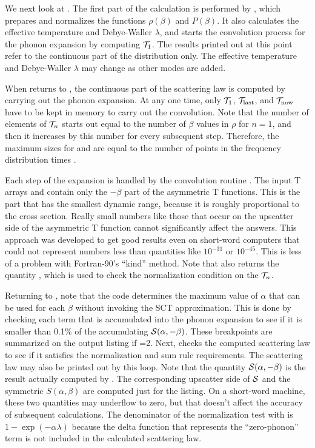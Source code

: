 We next look at . The
first part of the calculation is performed by
, which prepares and
normalizes the functions $\rho(\beta)$ and $P(\beta)$.  It also
calculates the effective temperature and Debye-Waller $\lambda$,
and starts the convolution process for the phonon expansion by
computing ${\cal T}_1$.  The results printed out at this point
refer to the continuous part of the distribution only.  The
effective temperature and Debye-Waller $\lambda$ may change
as other modes are added.

When  returns to , the continuous part of
the scattering law is computed by carrying out the phonon expansion.
At any one time, only ${\cal T}_1$, ${\cal T}_{\rm last}$, and
${\cal T}_{\rm now}$ have to be kept in memory to carry out the
convolution.  Note that the number of elements of ${\cal T}_n$ starts
out equal to the number of $\beta$ values in $\rho$ for $n{=}1$, and then
it increases by this number for every subsequent step. Therefore, the
maximum sizes for  and  are equal to the number
of points in the frequency distribution times .

Each step of the expansion is handled by the convolution routine
.  The input T arrays
 and  contain only the $-\beta$
part of the asymmetric T functions.  This is the part that
has the smallest dynamic range, because it is roughly proportional to
the cross section.  Really small numbers like those that occur on the
upscatter side of the asymmetric T function cannot significantly affect
the answers.  This approach was developed to get good results even on
short-word computers that could not represent numbers less than
quantities like $10^{-31}$ or $10^{-45}$.  This is less of a problem
with Fortran-90's ``kind'' method.  Note that 
also returns the quantity , which is used to check the
normalization condition on the ${\cal T}_n$.

Returning to , note that the code determines the maximum
value of $\alpha$ that can be used for each $\beta$ without invoking
the SCT approximation.  This is done by checking each term that is
accumulated into the phonon expansion to see if it is smaller than 0.1\%
of the accumulating ${\cal S}(\alpha,-\beta)$.  These breakpoints are
summarized on the output listing if =2.  Next,
 checks the computed scattering law to see if it satisfies
the normalization and sum rule requirements.  The scattering law may
also be printed out by this loop.  Note that the quantity
${\cal S}(\alpha,-\beta)$ is the result actually computed by
.  The corresponding upscatter side of ${\cal S}$ and
the symmetric $S(\alpha,\beta)$ are computed just for the listing.
On a short-word machine, these two quantities may underflow to zero,
but that doesn't affect the accuracy of subsequent calculations.
The denominator of the normalization test with  is
$1{-}\exp(-\alpha\lambda)$ because the delta function that represents
the ``zero-phonon'' term is not included in the calculated scattering law.

